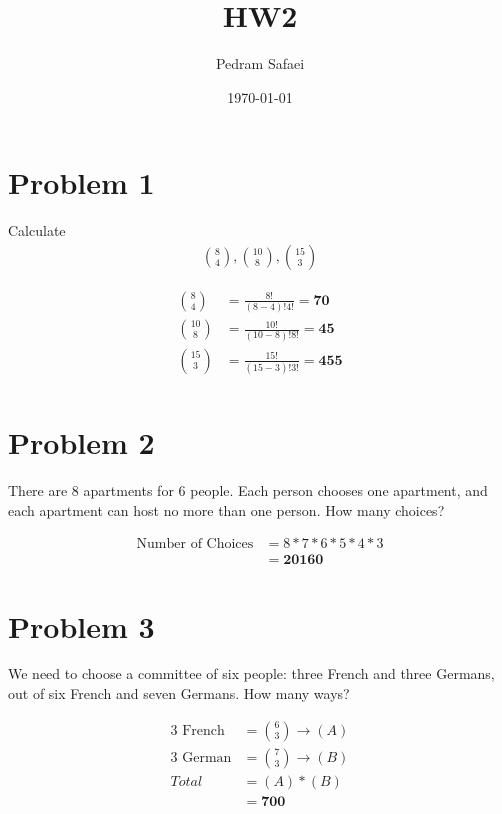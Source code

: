 \documentclass{article}
\title{HW2}
\date{\today}
\author{Pedram Safaei}
\begin{document}
	\maketitle
	\newpage
	
\section*{Problem 1} 
	
	Calculate 	
	\begin{align*} 
	{8 \choose 4}, {10 \choose 8},{15 \choose 3}
	\end{align*}
	
	\begin{align*}
	{8 \choose 4} &= \frac{8!}{(8-4)!4!} = \mathbf{70}\\
	{10 \choose 8} &= \frac{10!}{(10-8)!8!} = \mathbf{45}\\
	{15 \choose 3} &= \frac{15!}{(15-3)!3!} = \mathbf{455}\\
	\end{align*}
	
	
\section*{Problem 2} 
There are 8 apartments for 6 people. Each person chooses one apartment, and each apartment can host no more than one person. How many choices?
	
	\begin{align*}
	\text{Number of Choices} &=  8 * 7 * 6 * 5 * 4 * 3 \\
										 &= \mathbf{ 20160}
	\end{align*}
	
\section*{Problem 3} 
	We need to choose a committee of six people: three French and three Germans, out of six French and seven Germans. How many ways?
	
	\begin{align*}
	\text{3 French} &= {6 \choose 3}  \rightarrow (A) \\
	\text{3 German} &= {7 \choose 3} \rightarrow (B) \\
	Total &= (A) * (B) \\
			&= \mathbf{700} \\
	\end{align*}
	
\end{document}
